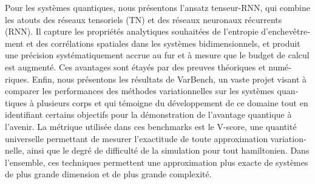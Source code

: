 \begin{otherlanguage}{french}
Pour les systèmes quantiques, nous présentons l'ansatz tenseur-RNN, qui combine les atouts des réseaux tensoriels (TN) et des réseaux neuronaux récurrents (RNN).
Il capture les propriétés analytiques souhaitées de l'entropie d'enchevêtrement et des corrélations spatiales dans les systèmes bidimensionnels, et produit une précision systématiquement accrue au fur et à mesure que le budget de calcul est augmenté.
Ces avantages sont étayés par des preuves théoriques et numériques.
Enfin, nous présentons les résultats de VarBench, un vaste projet visant à comparer les performances des méthodes variationnelles sur les systèmes quantiques à plusieurs corps et qui témoigne du développement de ce domaine tout en identifiant certains objectifs pour la démonstration de l'avantage quantique à l'avenir.
La métrique utilisée dans ces benchmarks est le V-score, une quantité universelle permettant de mesurer l'exactitude de toute approximation variationnelle, ainsi que le degré de difficulté de la simulation pour tout hamiltonien.
Dans l'ensemble, ces techniques permettent une approximation plus exacte de systèmes de plus grande dimension et de plus grande complexité.

\end{otherlanguage}
